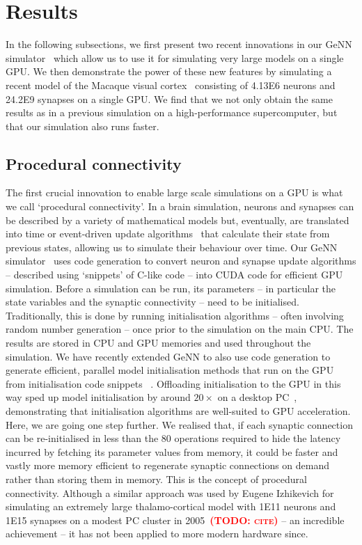 \documentclass[9pt,twocolumn,twoside,lineno]{pnas-new}
\newcommand{\todo}[1]{\textbf{\textsc{\textcolor{red}{(TODO: #1)}}}}
\begin{document}
\section*{Results}
In the following subsections, we first present two recent innovations in our GeNN simulator~\citep{Yavuz2016} which allow us to use it for simulating very large models on a single GPU.
We then demonstrate the power of these new features by simulating a recent model of the Macaque visual cortex~\citep{Schmidt2018} consisting of \num{4.13E6} neurons and \num{24.2E9} synapses on a single GPU.
We find that we not only obtain the same results as in a previous simulation on a high-performance supercomputer, but that our simulation also runs faster.

\subsection*{Procedural connectivity}
The first crucial innovation to enable large scale simulations on a GPU is what we call `procedural connectivity'.
In a brain simulation, neurons and synapses can be described by a variety of mathematical models but, eventually, are translated into time or event-driven update algorithms~\citep{Brette2007} that calculate their state from previous states, allowing us to simulate their behaviour over time.
Our GeNN simulator~\citep{Yavuz2016} uses code generation to convert neuron and synapse update algorithms -- described using `snippets' of C-like code -- into CUDA code for efficient GPU simulation.
Before a simulation can be run, its parameters -- in particular the state variables and the synaptic connectivity -- need to be initialised.
Traditionally, this is done by running initialisation algorithms -- often involving random number generation -- once prior to the simulation on the main CPU.
The results are stored in CPU and GPU memories and used throughout the simulation.
We have recently extended GeNN to also use code generation to generate efficient, parallel model initialisation methods that run on the GPU from initialisation code snippets ~\citep{Knight2018}.
Offloading initialisation to the GPU in this way sped up model initialisation by around $20\times$ on a desktop PC~\citep{Knight2018}, demonstrating that initialisation algorithms are well-suited to GPU acceleration.
Here, we are going one step further.
We realised that, if each synaptic connection can be re-initialised in less than the 80 operations required to hide the latency incurred by fetching its parameter values from memory, it could be faster and vastly more memory efficient to regenerate synaptic connections on demand rather than storing them in memory.
This is the concept of procedural connectivity.
Although a similar approach was used by Eugene Izhikevich for simulating an extremely large thalamo-cortical model with \num{1E11} neurons and \num{1E15} synapses on a modest PC cluster in 2005~\todo{cite} -- an incredible achievement -- it has not been applied to more modern hardware since.  
\end{document}
